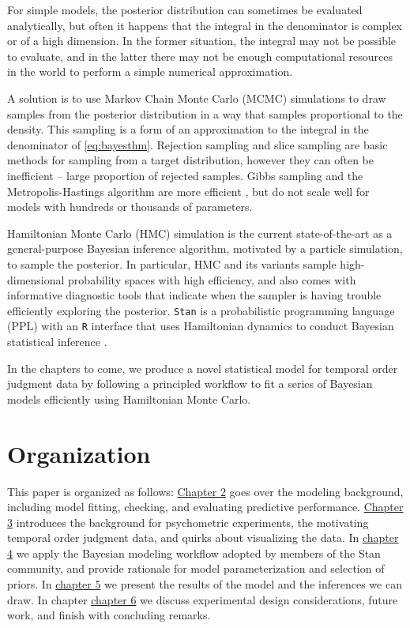 \documentclass[11pt, oneside, openany]{scrbook}
\begin{document}
For simple models, the posterior distribution can sometimes be evaluated analytically, but often it happens that the integral in the denominator is complex or of a high dimension. In the former situation, the integral may not be possible to evaluate, and in the latter there may not be enough computational resources in the world to perform a simple numerical approximation.

A solution is to use Markov Chain Monte Carlo (MCMC) simulations to draw samples from the posterior distribution in a way that samples proportional to the density. This sampling is a form of an approximation to the integral in the denominator of \eqref{eq:bayesthm}. Rejection sampling \citep{gilks1992adaptive} and slice sampling \citep{neal2003slice} are basic methods for sampling from a target distribution, however they can often be inefficient -- large proportion of rejected samples. Gibbs sampling and the Metropolis-Hastings algorithm are more efficient \citep{chib1995understanding}, but do not scale well for models with hundreds or thousands of parameters.

Hamiltonian Monte Carlo (HMC) simulation is the current state-of-the-art as a general-purpose Bayesian inference algorithm, motivated by a particle simulation, to sample the posterior. In particular, HMC and its variants sample high-dimensional probability spaces with high efficiency, and also comes with informative diagnostic tools that indicate when the sampler is having trouble efficiently exploring the posterior. \texttt{Stan} is a probabilistic programming language (PPL) with an \texttt{R} interface that uses Hamiltonian dynamics to conduct Bayesian statistical inference \citep{R-rstan}.

In the chapters to come, we produce a novel statistical model for temporal order judgment data by following a principled workflow to fit a series of Bayesian models efficiently using Hamiltonian Monte Carlo.

\hypertarget{organization}{%
\section{Organization}\label{organization}}

This paper is organized as follows: \protect\hyperlink{methods}{Chapter 2} goes over the modeling background, including model fitting, checking, and evaluating predictive performance. \protect\hyperlink{data}{Chapter 3} introduces the background for psychometric experiments, the motivating temporal order judgment data, and quirks about visualizing the data. In \protect\hyperlink{application}{chapter 4} we apply the Bayesian modeling workflow adopted by members of the Stan community, and provide rationale for model parameterization and selection of priors. In \protect\hyperlink{results}{chapter 5} we present the results of the model and the inferences we can draw. In chapter \protect\hyperlink{conclusion}{chapter 6} we discuss experimental design considerations, future work, and finish with concluding remarks.
\end{document}
